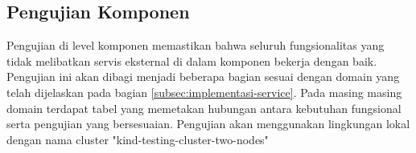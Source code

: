 \subsection{Pengujian Komponen}
Pengujian di level komponen memastikan bahwa seluruh fungsionalitas yang tidak melibatkan servis eksternal di dalam komponen bekerja dengan baik. Pengujian ini akan dibagi menjadi beberapa bagian sesuai dengan domain yang telah dijelaskan pada bagian \ref{subsec:implementasi-service}. Pada masing masing domain terdapat tabel yang memetakan hubungan antara kebutuhan fungsional serta pengujian yang bersesuaian. Pengujian akan menggunakan lingkungan lokal dengan nama cluster "kind-testing-cluster-two-nodes"






